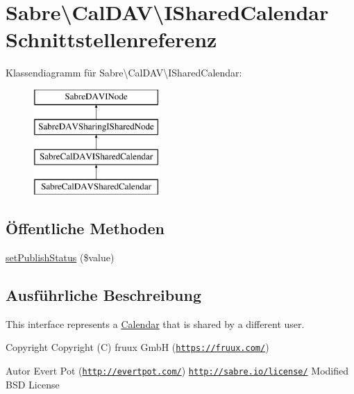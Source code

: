 \hypertarget{interface_sabre_1_1_cal_d_a_v_1_1_i_shared_calendar}{}\section{Sabre\textbackslash{}Cal\+D\+AV\textbackslash{}I\+Shared\+Calendar Schnittstellenreferenz}
\label{interface_sabre_1_1_cal_d_a_v_1_1_i_shared_calendar}
Klassendiagramm für Sabre\textbackslash{}Cal\+D\+AV\textbackslash{}I\+Shared\+Calendar\+:\begin{figure}[H]
\begin{center}
\leavevmode
\includegraphics[height=4.000000cm]{interface_sabre_1_1_cal_d_a_v_1_1_i_shared_calendar}
\end{center}
\end{figure}
\subsection*{Öffentliche Methoden}
\begin{DoxyCompactItemize}
\item 
\mbox{\hyperlink{interface_sabre_1_1_cal_d_a_v_1_1_i_shared_calendar_ae4570744db00653320964124880c8f93}{set\+Publish\+Status}} (\$value)
\end{DoxyCompactItemize}


\subsection{Ausführliche Beschreibung}
This interface represents a \mbox{\hyperlink{class_sabre_1_1_cal_d_a_v_1_1_calendar}{Calendar}} that is shared by a different user.

\begin{DoxyCopyright}{Copyright}
Copyright (C) fruux GmbH (\href{https://fruux.com/}{\tt https\+://fruux.\+com/}) 
\end{DoxyCopyright}
\begin{DoxyAuthor}{Autor}
Evert Pot (\href{http://evertpot.com/}{\tt http\+://evertpot.\+com/})  \href{http://sabre.io/license/}{\tt http\+://sabre.\+io/license/} Modified B\+SD License 
\end{DoxyAuthor}


